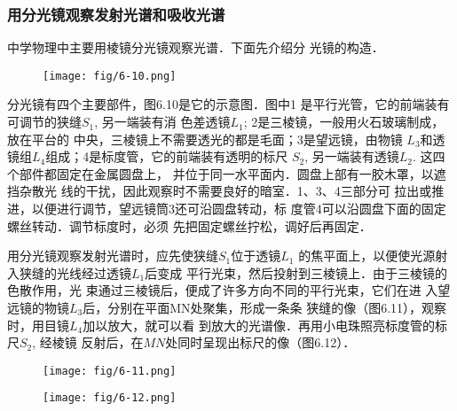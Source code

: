 \subsubsection{用分光镜观察发射光谱和吸收光谱}
中学物理中主要用棱镜分光镜观察光谱．下面先介绍分
光镜的构造．

\begin{figure}[htp]
    \centering
\texttt{[image: fig/6-10.png]}
    \caption{}
\end{figure}

分光镜有四个主要部件，图6.10是它的示意图．图中1
是平行光管，它的前端装有可调节的狭缝$S_1$, 另一端装有消
色差透镜$L_1$; 2是三棱镜，一般用火石玻璃制成，放在平台的
中央，三棱镜上不需要透光的都是毛面；3是望远镜，由物镜
$L_3$和透镜组$L_4$组成；4是标度管，它的前端装有透明的标尺
$S_2$, 另一端装有透镜$L_2$. 这四个部件都固定在金属圆盘上，
并位于同一水平面内．圆盘上部有一胶木罩，以遮挡杂散光
线的干扰，因此观察时不需要良好的暗室．1、3、4三部分可
拉出或推进，以便进行调节，望远镜筒3还可沿圆盘转动，标
度管4可以沿圆盘下面的固定螺丝转动．调节标度时，必须
先把固定螺丝拧松，调好后再固定．

用分光镜观察发射光谱时，应先使狭缝$S_1$位于透镜$L_1$
的焦平面上，以便使光源射入狭缝的光线经过透镜$L_1$后变成
平行光束，然后投射到三棱镜上．由于三棱镜的色散作用，光
束通过三棱镜后，便成了许多方向不同的平行光束，它们在进
入望远镜的物镜$L_3$后，分别在平面MN处聚集，形成一条条
狭缝的像（图6.11），观察时，用目镜$L_4$加以放大，就可以看
到放大的光谱像．再用小电珠照亮标度管的标尺$S_2$, 经棱镜
反射后，在$MN$处同时呈现出标尺的像（图6.12）．

\begin{figure}[htp]\centering
    \begin{minipage}[t]{0.48\textwidth}
    \centering
\texttt{[image: fig/6-11.png]}
    \caption{}
    \end{minipage}
    \begin{minipage}[t]{0.48\textwidth}
    \centering
\texttt{[image: fig/6-12.png]}
    \caption{}
    \end{minipage}
    \end{figure}

